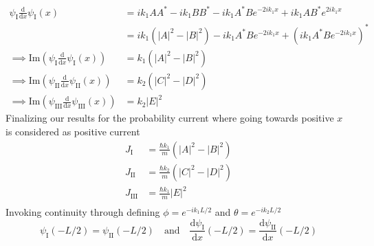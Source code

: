 \documentclass[letter, 10pts]{article}
\newcommand{\hb}{\hbar}
\begin{document}
\begin{align*}
	\psi_\text{I} \frac{\mathrm{d} }{\mathrm{d} x} \psi_\text{I} (x) 
	&= 
ik_1A A^{*} 
- i k_1 B B^{*}
- i k_1 A^{*} B e^{- 2 i k_1 x} + i k_1 A B^{*} e^{2i k_1 x} 
	\\
	&= 
	i k_1 (|A|^2 - |B|^2) - 
	i k_1 A^{*} B e^{- 2 i k_1 x}  
	+ \left(
i k_1 A^{*} B e^{- 2 i k_1 x} 
	\right)^{*}
	\\\implies
	\text{Im} \left(
	\psi_\text{I} \frac{\mathrm{d} }{\mathrm{d} x} \psi_\text{I} (x) 
\right) &= 
k_1 \left(|A|^2 - |B|^2\right)
\\
\implies
	\text{Im} \left(
	\psi_\text{II} \frac{\mathrm{d} }{\mathrm{d} x} \psi_\text{II} (x) 
\right) &= k_2 \left(|C|^2 - |D|^2\right) \\ 
\implies
	\text{Im} \left(
	\psi_\text{III} \frac{\mathrm{d} }{\mathrm{d} x} \psi_\text{III} (x) 
\right) &= k_2 |E|^2 
\end{align*}
Finalizing our results for the probability current where going towards positive $x$ is considered as positive current 
\begin{align*}
	J_\text{I} &= \frac{\hb k_1}{m} (|A|^2 - |B|^2) \\
	J_\text{II} &= \frac{\hb k_2}{m} (|C|^2 - |D|^2) \\
	J_\text{III} &= \frac{\hb k_1}{m} |E|^2  \\
\end{align*}
Invoking continuity through defining $\phi = e^{- i k_1 {L}/{2}}$ and $\theta = e^{ - i k_2 L / 2}$
\[
\psi_\text{I}(- L / 2) = \psi_\text{II}(- L / 2) 
\quad \text{and} \quad
\frac{\mathrm{d} \psi_\text{I}}{\mathrm{d} x} (- L / 2)
= \frac{\mathrm{d} \psi_\text{II}}{\mathrm{d} x} (- L / 2)
\] 
\end{document}
